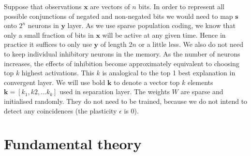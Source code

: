 \documentclass[12pt]{article}
\begin{document}
Suppose that observations $\boldsymbol{x}$ are vectors of $n$ bits. In order to represent all possible conjunctions of negated and non-negated bits we would need to map $\boldsymbol{s}$ onto $2^n$ neurons in $\boldsymbol{y}$ layer. As we use sparse population coding,  we know that only a small fraction of bits in $\boldsymbol{x}$ will be active at any given time. Hence in practice it suffices to only use $\boldsymbol{y}$ of length $2n$ or a little less. We also do not need to keep individual inhibitory neurons in the memory. As the number of neurons increases, the effects of inhibition become approximately equivalent to choosing top $k$ highest activations. This $k$ is analogical to the top 1 best explanation in convergent layer. We will use bold $\boldsymbol{k}$ to denote a vector top $k$ elements $\boldsymbol{k}=[k_1,k2,...k_k]$ used in separation layer. 
The weights $W$ are sparse and initialised randomly. They do not need to be trained, because we do not intend to detect any coincidences (the plasticity $\epsilon$ is $0$). 
\fi

\section{Fundamental theory}
\end{document}
